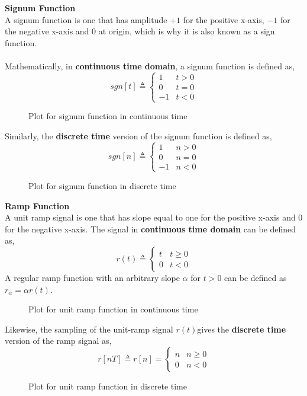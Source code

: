 \documentclass{article}[12 pt]
\begin{document}
\begin{solution}
{\begin{figure}[H]
\label{fig:rectDiscrete}
\end{figure}
\textbf{Signum Function}\\
A signum function is one that has amplitude $+1$ for the positive x-axis, $-1$ for the negative x-axis and $0$ at origin, which is why it is also known as a sign function.\\\\
Mathematically, in \textbf{continuous time domain}, a signum function is defined as,
\begin{equation*}
sgn[t] \triangleq \begin{cases}
  1 & t > 0\\
  0 & t=0\\
  -1 & t<0
\end{cases}
\end{equation*}
\begin{figure}[H]
\centering
\signumContinuous
\caption{Plot for signum function in continuous time}
\label{fig:signumContinuous}
\end{figure}
Similarly, the \textbf{discrete time} version of the signum function is defined as,
\begin{equation*}
sgn[n] \triangleq \begin{cases}
  1 & n > 0\\
  0 & n=0\\
  -1 & n<0
\end{cases}
\end{equation*}
\begin{figure}[H]
\centering
\signumDiscrete
\caption{Plot for signum function in discrete time}
\label{fig:signumDiscrete}
\end{figure}
}
\textbf{Ramp Function}\\
A unit ramp signal is one that has slope equal to one for the positive x-axis and 0 for the negative x-axis. The signal in \textbf{continuous time domain} can be defined as,
\begin{equation*}
r(t) \triangleq \begin{cases}
  t & t \geq 0\\
  0 & t<0
\end{cases}
\end{equation*}
A regular ramp function with an arbitrary slope $\alpha$ for $t>0$ can be defined as $r_\alpha=\alpha r(t)$.\\
\begin{figure}[H]
\centering
\rampContinuous
\caption{Plot for unit ramp function in continuous time}
\label{fig:rampContinuous}
\end{figure}
Likewise, the sampling of the unit-ramp signal $r(t)$gives the \textbf{discrete time} version of the ramp signal as,
\begin{equation*}
r[nT] \triangleq r[n]=\begin{cases}
  n & n \geq 0\\
  0 & n<0
\end{cases}
\end{equation*}
\begin{figure}[H]
\centering
\rampDiscrete
\caption{Plot for unit ramp function in discrete time}
\label{fig:rampDiscrete}
\end{figure}
\end{solution}
\end{document}
